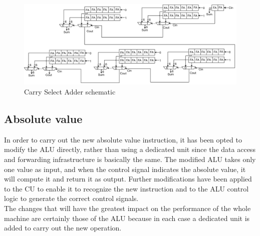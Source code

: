 \begin{figure}[htbp]
	\centering
	\includegraphics[width=1\textwidth]{sec2/images/csa_full2.png}
	\caption{Carry Select Adder schematic}
	\label{fig:CSA_full}
\end{figure}

\subsection{Absolute value}
In order to carry out the new absolute value instruction, it has been opted to modify the ALU directly, rather than using a dedicated unit since the data access and forwarding infrastructure is basically the same. The modified ALU takes only one value as input, and when the control signal indicates the absolute value, it will compute it and return it as output. Further modifications have been applied to the CU to enable it to recognize the new instruction and to the ALU control logic to generate the correct control signals.\\
The changes that will have the greatest impact on the performance of the whole machine are certainly those of the ALU because in each case a dedicated unit is added to carry out the new operation.

